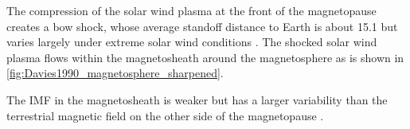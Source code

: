 The compression of the solar wind plasma at the front of the magnetopause creates a bow shock, whose average standoff distance to Earth is about \SI{15.1}{\RE} but varies largely under extreme solar wind conditions \citep{Fairfield1971}. The shocked solar wind plasma flows within the magnetosheath around the magnetosphere as is shown in \autoref{fig:Davies1990_magnetosphere_sharpened}.
\begin{figure}[htb]
\end{figure}
The IMF in the magnetosheath is weaker but has a larger variability than the terrestrial magnetic field on the other side of the magnetopause \citep{DeKeyser2005}.

